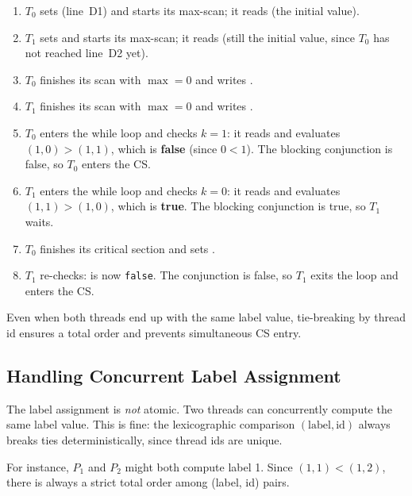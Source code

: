 \begin{enumerate}[nosep]
  \item $T_0$ sets  (line~D1) and starts its
        max-scan; it reads  (the initial value).
  \item $T_1$ sets  and starts its max-scan; it
        reads  (still the initial value, since $T_0$
        has not reached line~D2 yet).
  \item $T_0$ finishes its scan with $\max=0$ and writes
        .
  \item $T_1$ finishes its scan with $\max=0$ and writes
        .
  \item $T_0$ enters the while loop and checks $k=1$: it reads
         and evaluates $(1, 0) > (1, 1)$, which is
        \textbf{false} (since $0 < 1$). The blocking conjunction is false,
        so $T_0$ enters the CS.
  \item $T_1$ enters the while loop and checks $k=0$: it reads
         and evaluates $(1, 1) > (1, 0)$, which is
        \textbf{true}. The blocking conjunction is true, so $T_1$ waits.
  \item $T_0$ finishes its critical section and sets
        .
  \item $T_1$ re-checks:  is now \texttt{false}. The
        conjunction is false, so $T_1$ exits the loop and enters the CS.
\end{enumerate}

Even when both threads end up with the same label value, tie-breaking by
thread id ensures a total order and prevents simultaneous CS entry.

\subsection{Handling Concurrent Label Assignment}

\begin{ppkey}
\par
The label assignment is \emph{not} atomic. Two threads can concurrently compute
the same label value. This is fine: the lexicographic comparison $(\text{label},
\text{id})$ always breaks ties deterministically, since thread ids are unique.
\end{ppkey}

For instance, $P_1$ and $P_2$ might both compute label 1. Since $(1,1) < (1,2)$,
there is always a strict total order among (label, id) pairs.

